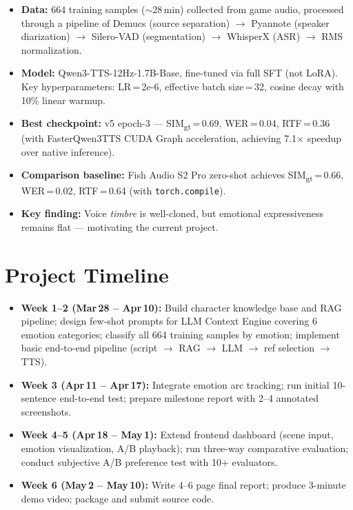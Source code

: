 \documentclass[11pt,a4paper]{article}
\begin{document}
\begin{itemize}
    \item \textbf{Data:} 664 training samples ($\sim$28\,min) collected from game audio, processed through a pipeline of Demucs (source separation) $\to$ Pyannote (speaker diarization) $\to$ Silero-VAD (segmentation) $\to$ WhisperX (ASR) $\to$ RMS normalization.
    \item \textbf{Model:} Qwen3-TTS-12Hz-1.7B-Base, fine-tuned via full SFT (not LoRA). Key hyperparameters: LR\,=\,2e-6, effective batch size\,=\,32, cosine decay with 10\% linear warmup.
    \item \textbf{Best checkpoint:} v5 epoch-3 --- SIM\textsubscript{gt}\,=\,0.69, WER\,=\,0.04, RTF\,=\,0.36 (with FasterQwen3TTS CUDA Graph acceleration, achieving 7.1$\times$ speedup over native inference).
    \item \textbf{Comparison baseline:} Fish Audio S2 Pro zero-shot achieves SIM\textsubscript{gt}\,=\,0.66, WER\,=\,0.02, RTF\,=\,0.64 (with \texttt{torch.compile}).
    \item \textbf{Key finding:} Voice \emph{timbre} is well-cloned, but emotional expressiveness remains flat --- motivating the current project.
\end{itemize}

\section{Project Timeline}

\begin{itemize}
    \item \textbf{Week 1--2 (Mar\,28 -- Apr\,10):} Build character knowledge base and RAG pipeline; design few-shot prompts for LLM Context Engine covering 6 emotion categories; classify all 664 training samples by emotion; implement basic end-to-end pipeline (script $\to$ RAG $\to$ LLM $\to$ ref selection $\to$ TTS).
    \item \textbf{Week 3 (Apr\,11 -- Apr\,17):} Integrate emotion arc tracking; run initial 10-sentence end-to-end test; prepare milestone report with 2--4 annotated screenshots.
    \item \textbf{Week 4--5 (Apr\,18 -- May\,1):} Extend frontend dashboard (scene input, emotion visualization, A/B playback); run three-way comparative evaluation; conduct subjective A/B preference test with 10+ evaluators.
    \item \textbf{Week 6 (May\,2 -- May\,10):} Write 4--6 page final report; produce 3-minute demo video; package and submit source code.
\end{itemize}
\end{document}
